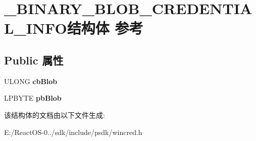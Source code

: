 \hypertarget{struct___b_i_n_a_r_y___b_l_o_b___c_r_e_d_e_n_t_i_a_l___i_n_f_o}{}\section{\+\_\+\+B\+I\+N\+A\+R\+Y\+\_\+\+B\+L\+O\+B\+\_\+\+C\+R\+E\+D\+E\+N\+T\+I\+A\+L\+\_\+\+I\+N\+F\+O结构体 参考}
\label{struct___b_i_n_a_r_y___b_l_o_b___c_r_e_d_e_n_t_i_a_l___i_n_f_o}
\subsection*{Public 属性}
\begin{DoxyCompactItemize}
\item 
\mbox{\label{struct___b_i_n_a_r_y___b_l_o_b___c_r_e_d_e_n_t_i_a_l___i_n_f_o_ad96fde07ca3f4364604ad46adc20242a}} 
U\+L\+O\+NG {\bfseries cb\+Blob}
\item 
\mbox{\label{struct___b_i_n_a_r_y___b_l_o_b___c_r_e_d_e_n_t_i_a_l___i_n_f_o_a9e9f99337543ea2681186b1881b20517}} 
L\+P\+B\+Y\+TE {\bfseries pb\+Blob}
\end{DoxyCompactItemize}


该结构体的文档由以下文件生成\+:\begin{DoxyCompactItemize}
\item 
E\+:/\+React\+O\+S-\/0../sdk/include/psdk/wincred.\+h\end{DoxyCompactItemize}
